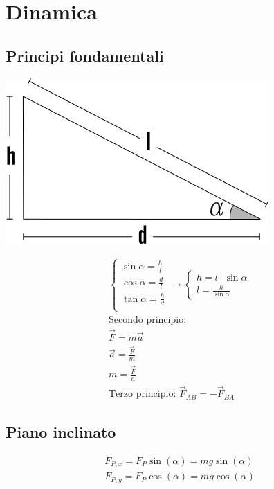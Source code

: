 \section{Dinamica}

\subsection{Principi fondamentali}

\begin{center}
    \includegraphics[width=0.6\linewidth]{Dinamica/piano-inclinato-senza-angolo.png} \\    
\end{center}

\begin{gather*}
    \begin{cases}
        \sin \alpha = \frac{h}{l} \\ 
        \cos \alpha = \frac{d}{l} \\
        \tan \alpha = \frac{h}{d} \\
    \end{cases} \rightarrow 
    \begin{cases}
        h = l \cdot \sin \alpha \\
        l = \frac{h}{\sin \alpha}
    \end{cases} \\
    \text{Secondo principio: } \\
    \vec{F} = m \vec{a} \\
    \vec{a} = \frac{\vec{F}}{m} \\
    m = \frac{\vec{F}}{a} \\
    \text{Terzo principio: } \vec{F}_{AB} = -\vec{F}_{BA}
\end{gather*}
\subsection{Piano inclinato}
\begin{gather*}
    F_{P, x} = F_P \sin (\alpha) = m g \sin (\alpha) \\
    F_{P, y} = F_P \cos (\alpha) = m g \cos (\alpha) 
\end{gather*}
